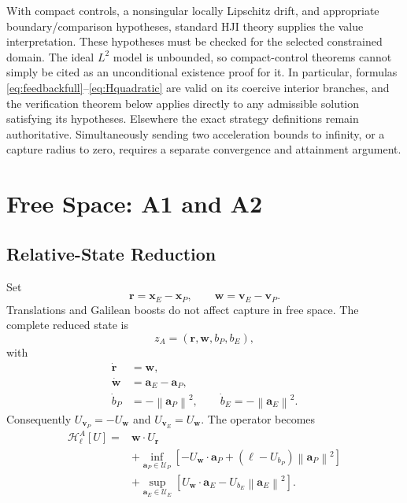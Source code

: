 \documentclass[journal,a4paper]{IEEEtran}
\newcommand{\U}{\mathcal U}
\newcommand{\HH}{\mathcal H}
\newcommand{\norm}[1]{\left\|#1\right\|}
\begin{document}
With compact controls, a nonsingular locally Lipschitz drift, and appropriate boundary/comparison hypotheses, standard HJI theory supplies the value interpretation. These hypotheses must be checked for the selected constrained domain. The ideal $L^2$ model is unbounded, so compact-control theorems cannot simply be cited as an unconditional existence proof for it. In particular, formulas \eqref{eq:feedbackfull}--\eqref{eq:Hquadratic} are valid on its coercive interior branches, and the verification theorem below applies directly to any admissible solution satisfying its hypotheses. Elsewhere the exact strategy definitions remain authoritative. Simultaneously sending two acceleration bounds to infinity, or a capture radius to zero, requires a separate convergence and attainment argument.

\section{Free Space: A1 and A2}
\label{sec:free}
\subsection{Relative-State Reduction}
Set
\begin{equation}
 \mathbf r=\mathbf x_E-\mathbf x_P,\qquad
 \mathbf w=\mathbf v_E-\mathbf v_P.
\end{equation}
Translations and Galilean boosts do not affect capture in free space. The complete reduced state is
\begin{equation}
 z_A=(\mathbf r,\mathbf w,b_P,b_E),
\end{equation}
with
\begin{subequations}\label{eq:relative}
\begin{align}
 \dot{\mathbf r}&=\mathbf w,\\
 \dot{\mathbf w}&=\mathbf a_E-\mathbf a_P,\\
 \dot b_P&=-\norm{\mathbf a_P}^2,\qquad
 \dot b_E=-\norm{\mathbf a_E}^2.
\end{align}
\end{subequations}
Consequently $U_{\mathbf v_P}=-U_{\mathbf w}$ and $U_{\mathbf v_E}=U_{\mathbf w}$. The operator becomes
\begin{align}
 \HH^A_\ell[U]={}&\mathbf w\cdot U_{\mathbf r}\nonumber\\
 &+\inf_{\mathbf a_P\in\U_P}
 [-U_{\mathbf w}\cdot\mathbf a_P
               +(\ell-U_{b_P})\norm{\mathbf a_P}^2]\nonumber\\
 &+\sup_{\mathbf a_E\in\U_E}
 [U_{\mathbf w}\cdot\mathbf a_E-U_{b_E}\norm{\mathbf a_E}^2].
 \label{eq:HA}
\end{align}
\end{document}
